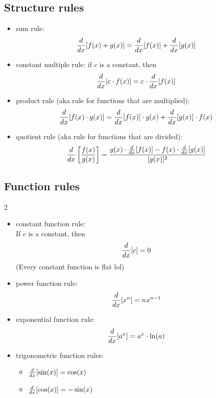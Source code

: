 \hrulefill
{ \everymath{\displaystyle}
    \subsection*{Structure rules}
    \begin{itemize}[label=\(\square\)]
        \item sum rule: 
        \[\frac{d}{dx}[f(x)+g(x)] = \frac{d}{dx}[f(x)]+\frac{d}{dx}[g(x)] \]
        \item constant multiple rule: if $c$ is a constant, then
        \[ \frac{d}{dx}[c\cdot f(x)] = c\cdot\frac{d}{dx}[f(x)] \]
        \item product rule (aka rule for functions that are multiplied): 
        \[\frac{d}{dx}[f(x) \cdot g(x)] = \frac{d}{dx}[f(x)] \cdot g(x) + \frac{d}{dx}[g(x)] \cdot f(x)\]
        \item quotient rule (aka rule for functions that are divided): 
        \[\frac{d}{dx}\left[\frac{f(x)}{g(x)}\right] 
        = \frac{g(x) \cdot \frac{d}{dx}[f(x)] - f(x) \cdot \frac{d}{dx}[g(x)]}{[g(x)]^2}\]
    \end{itemize}
    \subsection*{Function rules}
    \begin{multicols}{2}
        \begin{itemize}[label=\(\square\)]
            \item constant function rule: \\
            If $c$ is a constant, then
            \[\frac{d}{dx}[c] = 0\]
            (Every constant function is flat lol)
            \item power function rule: 
            \[\frac{d}{dx}[x^n] = nx^{n-1}\]
            \item exponential function rule: 
            \[\frac{d}{dx}[a^x] = a^x\cdot\ln(a)\]
            \item[] trigonometric function rules: 
            \begin{itemize}[label=\(\bigcirc\)]
                \item $\frac{d}{dx}[\sin(x)] = \cos(x)$
                \item $\frac{d}{dx}[\cos(x)] = -\sin(x)$
            \end{itemize}
        \end{itemize}
    \end{multicols}
}

